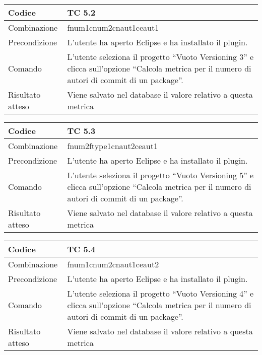 \begin{table}[ht]
\begin{tabular}{|p{3cm}|p{9cm}|}
\hline
\cellcolor{lightgray}Codice				& TC 5.2								\\
\hline
\cellcolor{lightgray}Combinazione		& fnum1cnum2cnaut1ceaut1 									\\
\hline
\cellcolor{lightgray}Precondizione		& L'utente ha aperto Eclipse e ha installato il plugin.				\\
\hline
\cellcolor{lightgray}Comando			& L'utente seleziona il progetto ``Vuoto Versioning 3''  e clicca sull'opzione ``Calcola metrica per il numero di autori di commit di un package''.	\\
\hline
\cellcolor{lightgray}Risultato atteso	& Viene salvato nel database il valore relativo a questa metrica	\\
\hline
\end{tabular}
\end{table}

\begin{table}[ht]
\begin{tabular}{|p{3cm}|p{9cm}|}
\hline
\cellcolor{lightgray}Codice				& TC 5.3								\\
\hline
\cellcolor{lightgray}Combinazione		& fnum2ftype1cnaut2ceaut1								\\
\hline
\cellcolor{lightgray}Precondizione		& L'utente ha aperto Eclipse e ha installato il plugin.					\\
\hline
\cellcolor{lightgray}Comando			& L'utente seleziona il progetto ``Vuoto Versioning 5''  e clicca sull'opzione ``Calcola metrica per il numero di autori di commit di un package''.	\\
\hline
\cellcolor{lightgray}Risultato atteso	& Viene salvato nel database il valore relativo a questa metrica	\\
\hline
\end{tabular}
\end{table}

\begin{table}[ht]
\begin{tabular}{|p{3cm}|p{9cm}|}
\hline
\cellcolor{lightgray}Codice				& TC 5.4								\\
\hline
\cellcolor{lightgray}Combinazione		& fnum1cnum2cnaut1ceaut2							\\
\hline
\cellcolor{lightgray}Precondizione		& L'utente ha aperto Eclipse e ha installato il plugin.			\\
\hline
\cellcolor{lightgray}Comando			& L'utente seleziona il progetto ``Vuoto Versioning 4''  e clicca sull'opzione ``Calcola metrica per il numero di autori di commit di un package''.	\\
\hline
\cellcolor{lightgray}Risultato atteso	& Viene salvato nel database il valore relativo a questa metrica	\\
\hline
\end{tabular}
\end{table}

